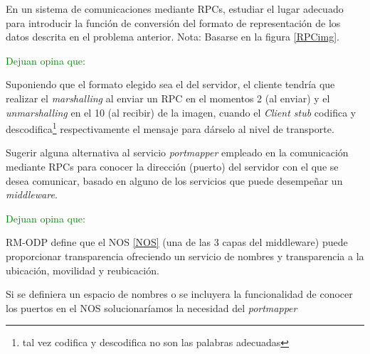   \begin{problem}[3]
  En un sistema de comunicaciones mediante RPCs, estudiar el lugar adecuado
para introducir la función de conversión del formato de representación de los
datos descrita en el problema anterior. Nota: Basarse en la figura \ref{RPCimg}.
  \solution

\textcolor{green}{Dejuan opina que:}

Suponiendo que el formato elegido sea el del servidor, el cliente tendría que realizar el \textit{marshalling} al enviar un RPC en el momentos 2 (al enviar) y el \textit{unmarshalling} en el 10 (al recibir) de la imagen, cuando el \textit{Client stub} codifica y descodifica\footnote{tal vez codifica y descodifica no son las palabras adecuadas} respectivamente el mensaje para dárselo al nivel de transporte.

  \end{problem}

  \begin{problem}[4]
  Sugerir alguna alternativa al servicio \textit{portmapper} empleado en la
comunicación mediante RPCs para conocer la dirección (puerto) del servidor
con el que se desea comunicar, basado en alguno de los servicios que puede
desempeñar un \textit{middleware}.
  \solution

\textcolor{green}{Dejuan opina que:}


RM-ODP define que el NOS \ref{NOS} (una de las 3 capas del middleware) puede proporcionar transparencia ofreciendo un servicio de nombres y transparencia a la ubicación, movilidad y reubicación.

Si se definiera un espacio de nombres o se incluyera la funcionalidad de conocer los puertos en el NOS solucionaríamos la necesidad del \textit{portmapper}

  \end{problem}


